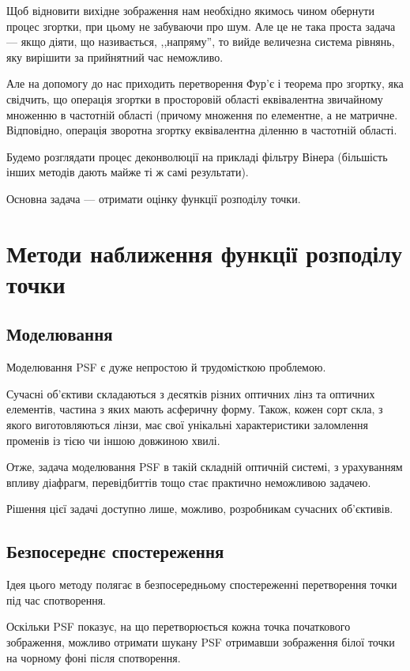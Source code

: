 \documentclass{diploma}
\begin{document}
  Щоб відновити вихідне зображення нам необхідно якимось чином обернути процес
  згортки, при цьому не забуваючи про шум.
  Але це не така проста задача --- якщо діяти, що називається, ,,напряму'', то
  вийде величезна система рівнянь, яку вирішити за прийнятний час неможливо.

  Але на допомогу до нас приходить перетворення Фур'є і теорема про згортку,
  яка свідчить, що операція згортки в просторовій області еквівалентна
  звичайному множенню в частотній області (причому множення по елементне, а не
  матричне.
  Відповідно, операція зворотна згортку еквівалентна діленню в частотній
  області.

  Будемо розглядати процес деконволюції на прикладі фільтру Вінера (більшість
  інших методів дають майже ті ж самі результати).

  Основна задача --- отримати оцінку функції розподілу точки.
  \clearpage
  \section{Методи наближення функції розподілу точки}
    \subsection{Моделювання}
      Моделювання PSF є дуже непростою й трудомісткою проблемою.

      Сучасні об’єктиви складаються з десятків різних оптичних лінз та оптичних
      елементів, частина з яких мають асферичну форму.
      Також, кожен сорт скла, з якого виготовляються лінзи, має свої унікальні
      характеристики заломлення променів із тією чи іншою довжиною хвилі.

      Отже, задача моделювання PSF в такій складній оптичній системі, з
      урахуванням впливу діафрагм, перевідбиттів тощо стає практично неможливою
      задачею.

      Рішення цієї задачі доступно лише, можливо, розробникам сучасних
      об’єктивів.
      \clearpage
    \subsection{Безпосереднє спостереження}
      Ідея цього методу полягає в безпосередньому спостереженні перетворення
      точки під час спотворення.

      Оскільки PSF показує, на що перетворюється кожна точка початкового
      зображення, можливо отримати шукану PSF отримавши зображення білої точки
      на чорному фоні після спотворення.
\end{document}
